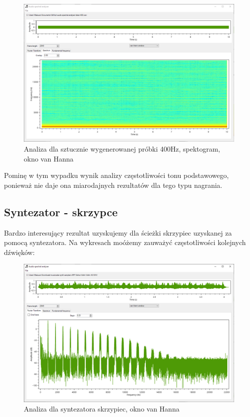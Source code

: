 \documentclass{article}
\begin{document}
\begin{figure}[H]
\includegraphics[width=6in]{scr6.png}
\centering
\caption{Analiza dla sztucznie wygenerowanej próbki 400Hz, spektogram, okno van Hanna}
\end{figure}

Pominę w tym wypadku wynik analizy częstotliwości tonu podstawowego, ponieważ nie daje ona miarodajnych rezultatów dla tego typu nagrania.

\subsection{Syntezator - skrzypce}

Bardzo interesujący rezultat uzyskujemy dla ścieżki skrzypiec uzyskanej za pomocą syntezatora. Na wykresach moóżemy zauważyć częstotliwości kolejnych dźwięków:

\begin{figure}[H]
\includegraphics[width=6in]{scr7.png}
\centering
\caption{Analiza dla syntezatora skrzypiec, okno van Hanna}
\end{figure}
\end{document}
